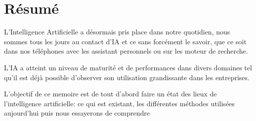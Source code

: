 \chapter*{Résumé}
L'Intelligence Artificielle a désormais pris place dans notre quotidien, 
nous sommes tous les jours au contact d'IA et ce sans forcément le savoir, que ce soit dans nos téléphones 
avec les assistant personnels ou sur les moteur de recherche.

L'IA a atteint un niveau de maturité et de performances dans divers domaines tel qu'il est déjà possible 
d'observer son utilisation grandissante dans les entreprises.

L'objectif de ce memoire est de tout d'abord faire un état des 
lieux de l'intelligence artificielle: ce qui est existant, les différentes 
méthodes utilisées aujourd'hui puis nous essayerons de comprendre 

